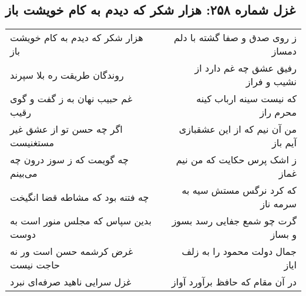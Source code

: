 \begin{center}
\section*{غزل شماره ۲۵۸: هزار شکر که دیدم به کام خویشت باز}
\label{sec:sh258}
\begin{longtable}{l p{0.5cm} r}
هزار شکر که دیدم به کام خویشت باز
&&
ز روی صدق و صفا گشته با دلم دمساز
\\
روندگان طریقت ره بلا سپرند
&&
رفیق عشق چه غم دارد از نشیب و فراز
\\
غم حبیب نهان به ز گفت و گوی رقیب
&&
که نیست سینه ارباب کینه محرم راز
\\
اگر چه حسن تو از عشق غیر مستغنیست
&&
من آن نیم که از این عشقبازی آیم باز
\\
چه گویمت که ز سوز درون چه می‌بینم
&&
ز اشک پرس حکایت که من نیم غماز
\\
چه فتنه بود که مشاطه قضا انگیخت
&&
که کرد نرگس مستش سیه به سرمه ناز
\\
بدین سپاس که مجلس منور است به دوست
&&
گرت چو شمع جفایی رسد بسوز و بساز
\\
غرض کرشمه حسن است ور نه حاجت نیست
&&
جمال دولت محمود را به زلف ایاز
\\
غزل سرایی ناهید صرفه‌ای نبرد
&&
در آن مقام که حافظ برآورد آواز
\\
\end{longtable}
\end{center}
